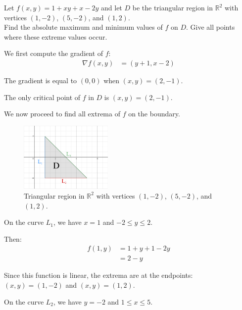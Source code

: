 \begin{tcolorbox}[
        title={Problem 44},
        valign=center,
        nobeforeafter,
        colframe=gray!95!black
    ]
Let \(f(x, y) = 1 + xy + x - 2y\) and let \(D\) be the triangular region in \(\mathbb{R}^2\) with vertices \((1, -2)\), \((5, -2)\), and \((1, 2)\). \\

Find the absolute maximum and minimum values of \(f\) on \(D\). Give all points where these extreme values occur.
\end{tcolorbox}

\begin{solution}
    We first compute the gradient of \(f\):
    \begin{align}
        \nabla f(x, y) &= \left(y + 1, x - 2\right)
    \end{align}
    
    The gradient is equal to \((0, 0)\) when \((x, y) = (2, -1)\).
    
    The only critical point of \(f\) in \(D\) is \((x, y) = (2, -1)\).
    
    We now proceed to find all extrema of \(f\) on the boundary.
    
    \begin{figure}[h]
        \centering
        \includegraphics[width=0.4\textwidth]{Pictures/Tutorial 3-1.png}
        \caption{Triangular region in \(\mathbb{R}^2\) with vertices \((1, -2)\), \((5, -2)\), and \((1, 2)\).}
    \end{figure}
    
    On the curve \(L_1\), we have \(x = 1\) and \(-2 \leq y \leq 2\). 
    
    Then:
    \begin{align*}
        f(1, y) &= 1 + y + 1 - 2y \\
        &= 2 - y
    \end{align*}
    
    Since this function is linear, the extrema are at the endpoints: \((x, y) = (1, -2)\) and \((x, y) = (1, 2)\).
    
    On the curve \(L_2\), we have \(y = -2\) and \(1 \leq x \leq 5\). 
    

\end{solution}
